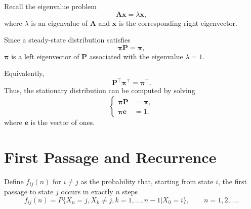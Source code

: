 \documentclass[../Note.tex]{subfiles}
\begin{document}
\begin{remark}
    Recall the eigenvalue problem
    \[
        \mathbf{A}\bm{x}=\lambda\bm{x},
    \] 
    where $\lambda$ is an eigenvalue of $\mathbf{A}$ and $\bm{x}$ is the corresponding right eigenvector.

    Since a steady-state distribution satisfies
    \[
        \bm{\pi}\mathbf{P}=\bm{\pi},
    \] 
    $\bm{\pi}$ is a left eigenvector of $\mathbf{P}$ associated with the eigenvalue $\lambda=1$.

    Equivalently,
    \[
        \mathbf{P}^{\top}\bm{\pi}^{\top} = \bm{\pi}^{\top}.
    \]
    Thus, the stationary distribution can be computed by solving
    \begin{equation}
    \left\{
    \begin{aligned}
        \bm{\pi}\mathbf{P} &= \bm{\pi}, \\
        \bm{\pi}\bm{e} &= 1.
    \end{aligned}
    \right.        
    \end{equation} 
    where $\bm{e}$ is the vector of ones.
\end{remark}

\section{First Passage and Recurrence}

Define $f_{ij}(n)$ for $i \ne j$ as the probability that, starting from state $i$, the first passage to state $j$ occurs in exactly $n$ steps 
\begin{equation}
    f_{ij}(n) = P\{X_n = j , X_k \ne j , k = 1, \dots, n -1 | X_0 = i\}, \qquad n = 1, 2, \dots.
\end{equation} 
\end{document}
